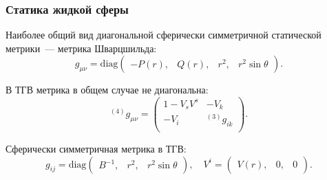 \documentclass[compress]{beamer}
\begin{document}
    \begin{frame}\frametitle{Статика жидкой сферы}

        Наиболее общий вид диагональной сферически симметричной статической метрики~--- метрика Шварцшильда:
        \begin{equation*}
            g_{\mu\nu} = \text{diag} \begin{pmatrix}
                -P(r),& Q(r),& r^2,& r^2 \sin\theta
            \end{pmatrix} .
        \end{equation*}

        В ТГВ метрика в общем случае не диагональна:
        \begin{equation*}
            {}^{(4)} g_{\mu\nu} = \begin{pmatrix}
                1 - V_s V^s  & -V_k   \\
                -V_i         & {}^{(3)} g_{ik} \\
            \end{pmatrix} .
        \end{equation*}

        Сферически симметричная метрика в ТГВ:
        \begin{equation*}
            g_{ij} = \text{diag} \begin{pmatrix}B^{-1}, & r^2, & r^2 \sin\theta\end{pmatrix} , \quad
            V^i = \begin{pmatrix}V(r), & 0, & 0\end{pmatrix} .
        \end{equation*}

    \end{frame}

\end{document}
